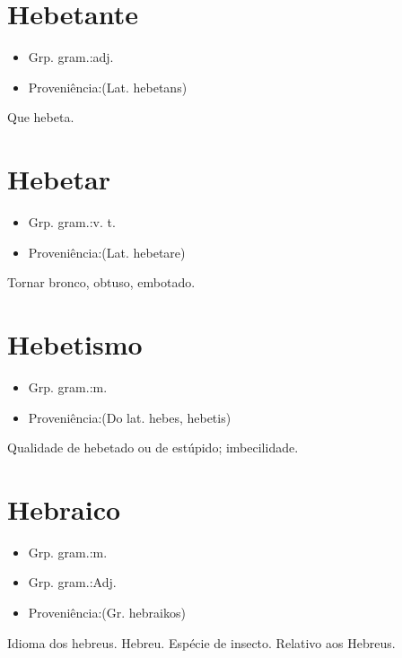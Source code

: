 \documentclass{article}
\begin{document}
\section{Hebetante}
\begin{itemize}
\item {Grp. gram.:adj.}
\end{itemize}
\begin{itemize}
\item {Proveniência:(Lat. \textunderscore hebetans\textunderscore )}
\end{itemize}
Que hebeta.
\section{Hebetar}
\begin{itemize}
\item {Grp. gram.:v. t.}
\end{itemize}
\begin{itemize}
\item {Proveniência:(Lat. \textunderscore hebetare\textunderscore )}
\end{itemize}
Tornar bronco, obtuso, embotado.
\section{Hebetismo}
\begin{itemize}
\item {Grp. gram.:m.}
\end{itemize}
\begin{itemize}
\item {Proveniência:(Do lat. \textunderscore hebes\textunderscore , \textunderscore hebetis\textunderscore )}
\end{itemize}
Qualidade de hebetado ou de estúpido; imbecilidade.
\section{Hebraico}
\begin{itemize}
\item {Grp. gram.:m.}
\end{itemize}
\begin{itemize}
\item {Grp. gram.:Adj.}
\end{itemize}
\begin{itemize}
\item {Proveniência:(Gr. \textunderscore hebraikos\textunderscore )}
\end{itemize}
Idioma dos hebreus.
Hebreu.
Espécie de insecto.
Relativo aos Hebreus.
\end{document}
